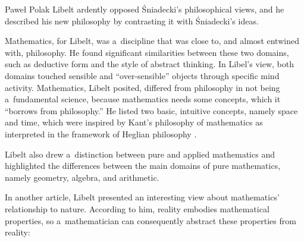 \begin{artengenv}{Paweł Polak}
Libelt
\parencite*[][p.240nn]{libelt_filologia_1850} %
 ardently opposed Śniadecki's philosophical views, and he described his new philosophy by contrasting it with Śniadecki's ideas.

Mathematics, for Libelt, was a~discipline that was close to, and almost entwined with, philosophy. He found significant similarities between these two domains, such as deductive form and the style of abstract thinking. In Libel's view, both domains touched sensible and ``over-sensible'' objects through specific mind activity. Mathematics, Libelt posited, differed from philosophy in not being a~fundamental science, because mathematics needs some concepts, which it ``borrows from philosophy.'' He listed two basic, intuitive concepts, namely space and time, which were inspired by Kant's philosophy of mathematics as interpreted in the framework of Heglian philosophy
\parencite[][p.269]{libelt_filologia_1850}.%


Libelt also drew a~distinction between pure and applied mathematics and highlighted the differences between the main domains of pure mathematics, namely geometry, algebra, and arithmetic.

In another article, Libelt
\parencite*[][pp.65–67]{libelt_filozofia_1842} %
 presented an interesting view about mathematics' relationship to nature. According to him, reality embodies mathematical properties, so a~mathematician can consequently abstract these properties from reality:


\end{artengenv}
